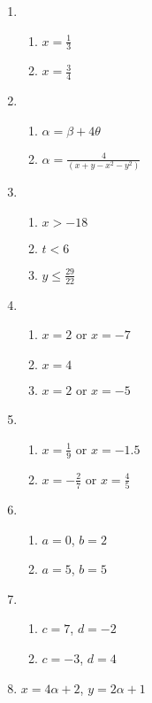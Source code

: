 \documentclass[11pt]{article}
\begin{document}
\begin{enumerate}
\item 
\begin{enumerate}
\item $x = \frac{1}{3}$
\item $x = \frac{3}{4}$
\end{enumerate}


\item 
\begin{enumerate}
\item $\alpha = \beta + 4\theta$
\item $\alpha = \frac{4}{(x + y - x^2 - y^2)}$
\end{enumerate}


\item 
\begin{enumerate}
\item $x > -18$
\item $t < 6$
\item $y \leq \frac{29}{22}$
\end{enumerate}


\item 
\begin{enumerate}
\item $x = 2$ or $x=-7$
\item $x=4$
\item $x=2$ or $x=-5$
\end{enumerate}


\item 
\begin{enumerate}
\item $x=\frac{1}{9}$ or $x=-1.5$
\item $x= -\frac{2}{7}$ or $x=\frac{4}{5}$
\end{enumerate}


\item 
\begin{enumerate}
\item $a=0$, $b=2$
\item $a=5$, $b=5$
\end{enumerate}



\item 
\begin{enumerate}
\item $c=7$, $d=-2$
\item $c=-3$, $d=4$
\end{enumerate}


\item $x=4\alpha + 2$, $y=2\alpha + 1$



\end{enumerate}
\end{document}
